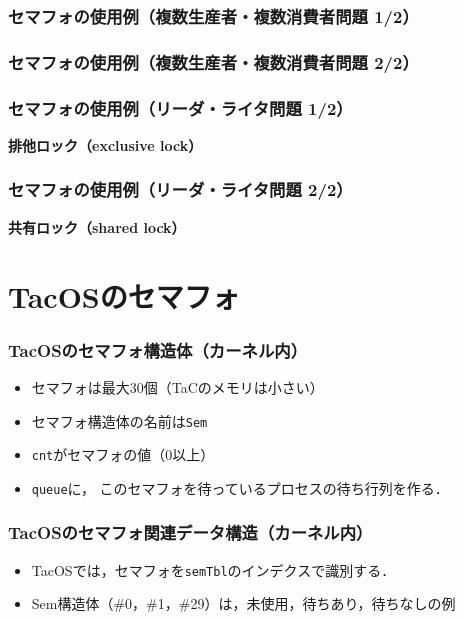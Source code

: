 \documentclass[unicode]{beamer}                   %
\begin{document}
\begin{frame}
  \frametitle{セマフォの使用例（複数生産者・複数消費者問題 1/2）}
\end{frame}

\begin{frame}
  \frametitle{セマフォの使用例（複数生産者・複数消費者問題 2/2）}
\end{frame}

\begin{frame}
  \frametitle{セマフォの使用例（リーダ・ライタ問題 1/2）}
  {\bf 排他ロック（exclusive lock）}
\end{frame}

\begin{frame}
  \frametitle{セマフォの使用例（リーダ・ライタ問題 2/2）}
  {\bf 共有ロック（shared lock）}
\end{frame}

\section{TacOSのセマフォ}
\begin{frame}
  \frametitle{TacOSのセマフォ構造体（カーネル内）}
  \begin{itemize}
    \item セマフォは最大30個（TaCのメモリは小さい）
    \item セマフォ構造体の名前は{\tt Sem}
    \item {\tt cnt}がセマフォの値（0以上）
    \item {\tt queue}に，
      このセマフォを待っているプロセスの待ち行列を作る．
  \end{itemize}
\end{frame}

\begin{frame}
  \frametitle{TacOSのセマフォ関連データ構造（カーネル内）}
  \begin{itemize}
    \item TacOSでは，セマフォを{\tt semTbl}のインデクスで識別する．
    \item Sem構造体（\#0，\#1，\#29）は，未使用，待ちあり，待ちなしの例
  \end{itemize}
\end{frame}
\end{document}
